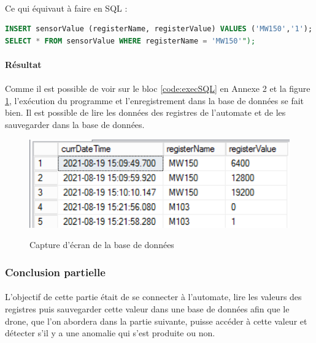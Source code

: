             \paragraph*{}
            Ce qui équivaut à faire en SQL :
            \begin{lstlisting}[language=SQL, caption=Équivalent SQL]
INSERT sensorValue (registerName, registerValue) VALUES ('MW150','1');
SELECT * FROM sensorValue WHERE registerName = 'MW150'");\end{lstlisting}
        
        
        \paragraph{Résultat}    
        \paragraph*{}
        Comme il est possible de voir sur le bloc \ref{code:execSQL} en Annexe 2 et la figure \ref{fig:saveSQL}, l'exécution du programme et l'enregistrement dans la base de données se fait bien. Il est possible de lire les données des registres de l'automate et de les sauvegarder dans la base de données.
        
        
        \begin{figure}[H]
            \centering
            \begin{frame}{\includegraphics[width=1\textwidth]{image/exempleSQLSave.png}}
            \end{frame}
            \caption{\label{fig:saveSQL}Capture d'écran de la base de données}
        \end{figure}
    
    \subsubsection{Conclusion partielle}
        \paragraph*{}
        L'objectif de cette partie était de se connecter à l'automate, lire les valeurs des registres puis sauvegarder cette valeur dans une base de données afin que le drone, que l'on abordera dans la partie suivante, puisse accéder à cette valeur et détecter s'il y a une anomalie qui s'est produite ou non.
        
